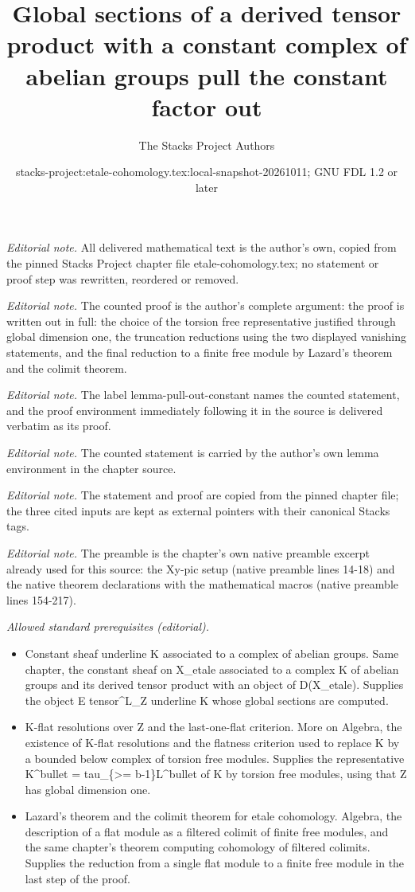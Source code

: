 \documentclass[10pt,a4paper]{amsart}
\title{Global sections of a derived tensor product with a constant complex of abelian groups pull the constant factor out}
\author{The Stacks Project Authors}
\date{stacks-project:etale-cohomology.tex:local-snapshot-20261011; GNU FDL 1.2 or later}
\theoremstyle{plain}
\theoremstyle{definition}
\theoremstyle{remark}
\numberwithin{equation}{subsection}
\begin{document}
\maketitle
\noindent\textit{Editorial note.} All delivered mathematical text is the author's own, copied from the pinned Stacks Project chapter file etale-cohomology.tex; no statement or proof step was rewritten, reordered or removed.\par\medskip
\noindent\textit{Editorial note.} The counted proof is the author's complete argument: the proof is written out in full: the choice of the torsion free representative justified through global dimension one, the truncation reductions using the two displayed vanishing statements, and the final reduction to a finite free module by Lazard's theorem and the colimit theorem.\par\medskip
\noindent\textit{Editorial note.} The label lemma-pull-out-constant names the counted statement, and the proof environment immediately following it in the source is delivered verbatim as its proof.\par\medskip
\noindent\textit{Editorial note.} The counted statement is carried by the author's own lemma environment in the chapter source.\par\medskip
\noindent\textit{Editorial note.} The statement and proof are copied from the pinned chapter file; the three cited inputs are kept as external pointers with their canonical Stacks tags.\par\medskip
\noindent\textit{Editorial note.} The preamble is the chapter's own native preamble excerpt already used for this source: the Xy-pic setup (native preamble lines 14-18) and the native theorem declarations with the mathematical macros (native preamble lines 154-217).\par\medskip
\noindent\textit{Allowed standard prerequisites (editorial).}\begin{itemize}
\item Constant sheaf underline K associated to a complex of abelian groups. Same chapter, the constant sheaf on X\_etale associated to a complex K of abelian groups and its derived tensor product with an object of D(X\_etale). Supplies the object E tensor\textasciicircum{}L\_Z underline K whose global sections are computed.
\item K-flat resolutions over Z and the last-one-flat criterion. More on Algebra, the existence of K-flat resolutions and the flatness criterion used to replace K by a bounded below complex of torsion free modules. Supplies the representative K\textasciicircum{}bullet = tau\_\{>= b-1\}L\textasciicircum{}bullet of K by torsion free modules, using that Z has global dimension one.
\item Lazard's theorem and the colimit theorem for etale cohomology. Algebra, the description of a flat module as a filtered colimit of finite free modules, and the same chapter's theorem computing cohomology of filtered colimits. Supplies the reduction from a single flat module to a finite free module in the last step of the proof.
\end{itemize}\medskip
\end{document}
